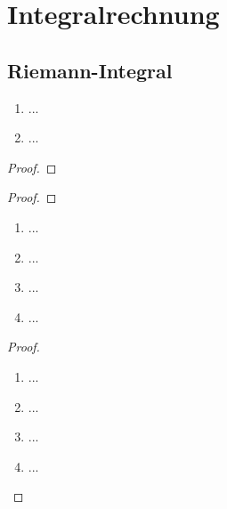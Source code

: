 \documentclass[12pt]{scrreprt}
\begin{document}
\begin{bsp}\label{}

\end{bsp}

\chapter{Integralrechnung}
\label{cha:int}

\section{Riemann-Integral}
\label{}

\begin{dfn}\label{}

\end{dfn}

\begin{lem}\label{}
\begin{enumerate}
\item ...
\item ...
\end{enumerate}
\end{lem}
\begin{proof}

\end{proof}

\begin{bsp}\label{}

\end{bsp}

\begin{bem}\label{}

\end{bem}

\begin{satz}\label{}

\end{satz}
\begin{proof}

\end{proof}

\begin{dfn*}

\end{dfn*}

\begin{satz}\label{}
\begin{enumerate}
\item ...
\item ...
\item ...
\item ...
\end{enumerate}
\end{satz}
\begin{proof}
\begin{enumerate}
\item ...
\item ...
\item ...
\item ...
\end{enumerate}
\end{proof}
\end{document}
